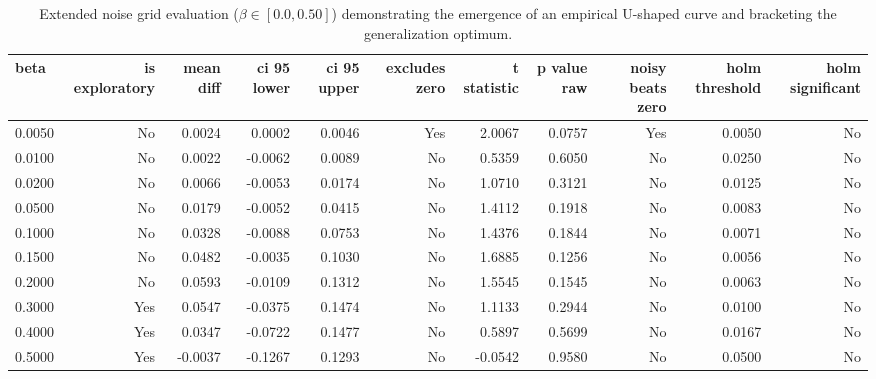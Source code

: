 \begin{table}[htbp]
\centering
\caption{Extended noise grid evaluation ($\beta \in [0.0, 0.50]$) demonstrating the emergence of an empirical U-shaped curve and bracketing the generalization optimum.}
\label{tab:exploratory_sweep}
\begin{tabular}{lrrrrrrrrrr}
\toprule
\textbf{beta} & \textbf{is exploratory} & \textbf{mean diff} & \textbf{ci 95 lower} & \textbf{ci 95 upper} & \textbf{excludes zero} & \textbf{t statistic} & \textbf{p value raw} & \textbf{noisy beats zero} & \textbf{holm threshold} & \textbf{holm significant} \\
\midrule
0.0050 & No & 0.0024 & 0.0002 & 0.0046 & Yes & 2.0067 & 0.0757 & Yes & 0.0050 & No \\
0.0100 & No & 0.0022 & -0.0062 & 0.0089 & No & 0.5359 & 0.6050 & No & 0.0250 & No \\
0.0200 & No & 0.0066 & -0.0053 & 0.0174 & No & 1.0710 & 0.3121 & No & 0.0125 & No \\
0.0500 & No & 0.0179 & -0.0052 & 0.0415 & No & 1.4112 & 0.1918 & No & 0.0083 & No \\
0.1000 & No & 0.0328 & -0.0088 & 0.0753 & No & 1.4376 & 0.1844 & No & 0.0071 & No \\
0.1500 & No & 0.0482 & -0.0035 & 0.1030 & No & 1.6885 & 0.1256 & No & 0.0056 & No \\
0.2000 & No & 0.0593 & -0.0109 & 0.1312 & No & 1.5545 & 0.1545 & No & 0.0063 & No \\
0.3000 & Yes & 0.0547 & -0.0375 & 0.1474 & No & 1.1133 & 0.2944 & No & 0.0100 & No \\
0.4000 & Yes & 0.0347 & -0.0722 & 0.1477 & No & 0.5897 & 0.5699 & No & 0.0167 & No \\
0.5000 & Yes & -0.0037 & -0.1267 & 0.1293 & No & -0.0542 & 0.9580 & No & 0.0500 & No \\
\bottomrule
\end{tabular}
\end{table}